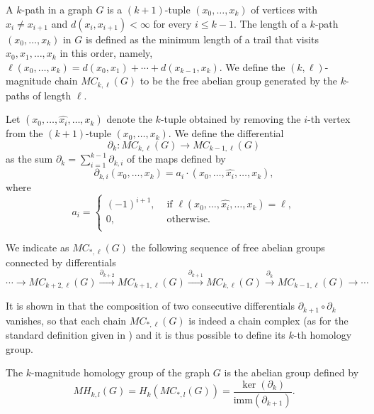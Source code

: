 \documentclass[runningheads]{llncs}
\newcommand{\imm}{\mathrm{imm}}
\begin{document}
A $k$-path in a graph $G$ is a $(k+1)$-tuple $(x_0,\dots,x_k)$ of vertices  with $x_i \neq x_{i+1}$ and $d(x_i,x_{i+1})<\infty$ for every $i \leq k-1$.
The length of a $k$-path $(x_0,\dots,x_k)$ in $G$ is defined as the minimum length of a trail that visits $x_0,x_1,\ldots,x_k$ in this order, namely, 
\(
\ell (x_0,\dots,x_k) = d(x_0,x_1)+\cdots + d(x_{k-1},x_k).
\)
We define the $(k,\ell)$-magnitude chain $MC_{k,\ell}(G)$ to be the free abelian group generated by the $k$-paths of length $\ell$.

\begin{definition}%
\label{differential}
Let $(x_0,\dots,\hat{x_i},\dots,x_k)$ denote the $k$-tuple obtained by removing the $i$-th vertex from the $(k+1)$-tuple $(x_0,\dots,x_k)$.  We define the differential 
\[
\partial_k: MC_{k,\ell}(G) \to MC_{k-1,\ell}(G)
\]
as the sum $\partial_k= \sum_{i=1}^{k-1} \partial_{k,i}$ of the maps defined by 
\[
\partial_{k,i}(x_0,\dots,x_k) = a_i\cdot(x_0,\dots,\hat{x_i},\dots,x_k),
\]
where
\[a_i=\begin{cases}
(-1)^{i+1}, &\text{ if } \ell(x_0,\dots,\hat{x_i},\dots,x_k) = \ell, \\
0, &\text{ otherwise.}\\
\end{cases}
\]
\end{definition}

\begin{definition}
We indicate as $MC_{*,\ell}(G)$ the following sequence of free abelian groups connected by differentials
\[
\cdots \to MC_{k+2,\ell}(G) \xrightarrow{\partial_{k+2}} MC_{k+1,\ell}(G) \xrightarrow{\partial_{k+1}} MC_{k,\ell}(G) \xrightarrow{\partial_{k}} MC_{k-1,\ell}(G) \to \cdots
\]
\end{definition}

It is shown in \cite[Lemma 11]{hepworth2015categorifying} that the composition of two consecutive differentials $\partial_{k+1} \circ \partial_k$ vanishes, so that each chain $MC_{*,\ell}(G)$ is indeed a chain complex (as for the standard definition given in \cite{hatcher2005algebraic}) and it is thus possible to define its $k$-th homology group.

\begin{definition}
\label{def_MH}
The $k$-magnitude homology group of the graph $G$ is the abelian group defined by
\[
MH_{k,l}(G) = H_k(MC_{*,l}(G)) = \frac{\ker(\partial_k)}{\imm(\partial_{k+1})}.
\]
\end{definition}
\end{document}
